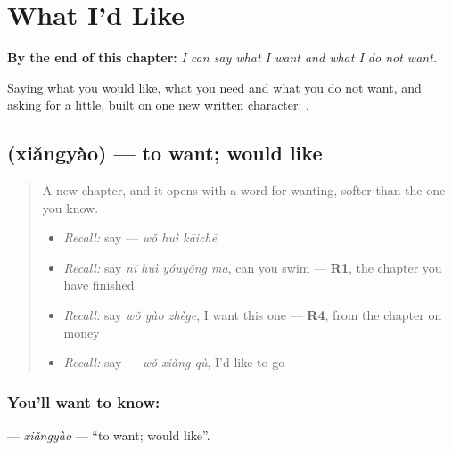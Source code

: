 
\chapter{What I'd Like}
\label{ch:zh-what-id-like}

\begin{chapteropening}
\textbf{By the end of this chapter:} \emph{I can say what I want and what I do not want.}

Saying what you would like, what you need and what you do not want, and asking for a little, built on one new written character: .
\end{chapteropening}

\section[\texorpdfstring{\zh{想要} (xiǎngyào)}{想要 (xiǎngyào)}]{ (xiǎngyào) — to want; would like}

\label{lesson:ZH-C91-xiangyao}



\begin{quote}
A new chapter, and it opens with a word for wanting, softer than the one you know.

\begin{itemize}
\raggedright
  \item \emph{Recall:} say  — \emph{wǒ huì kāichē}
  \item \emph{Recall:} say \emph{nǐ huì yóuyǒng ma}, can you swim — \textbf{R1}, the chapter you have finished
  \item \emph{Recall:} say \emph{wǒ yào zhège}, I want this one — \textbf{R4}, from the chapter on money
  \item \emph{Recall:} say  — \emph{wǒ xiǎng qù}, I'd like to go
\end{itemize}
\end{quote}

\subsection*{You'll want to know: }
\textbf{} — \emph{xiǎngyào} — \textquotedblleft{}to want; would like\textquotedblright{}.

